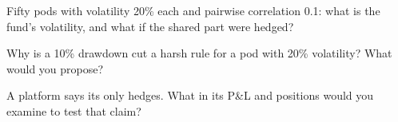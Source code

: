 \begin{interviewq}\label{iq:fm:the-multi-manager-platform:4}
Fifty pods with volatility 20\% each and pairwise correlation 0.1: what is the fund's volatility, and what if the shared part were hedged?
\end{interviewq}

\begin{interviewq}\label{iq:fm:the-multi-manager-platform:5}
Why is a 10\% drawdown cut a harsh rule for a pod with 20\% volatility? What would you propose?
\end{interviewq}

\begin{interviewq}\label{iq:fm:the-multi-manager-platform:6}
A platform says its  only hedges. What in its P\&L and positions would you examine to test that claim?
\end{interviewq}
